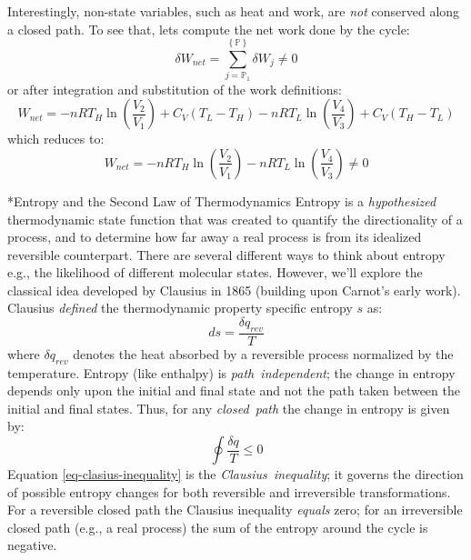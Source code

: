 \documentclass[11pt]{article}
\makeatletter
\theoremstyle{definition}
\renewcommand\subsection{\@startsection
	{subsection}{2}{0mm}
	{-0.05in}
	{0.5\baselineskip}
	{\normalfont\normalsize\bfseries}}
\makeatother
\begin{document}
Interestingly, non-state variables, such as heat and work, are \textit{not} conserved along a closed path. To see that, lets compute the
net work done by the cycle:
\begin{equation}
\delta{W}_{net} = \sum_{j=\mathbb{P}_{1}}^{\left\{\mathbb{P}\right\}}\delta{W}_j\neq 0
\end{equation}or after integration and substitution of the work definitions:
\begin{equation}
W_{net} = - nRT_{H}\ln\left(\frac{V_{2}}{V_{1}}\right) + C_{V}\left(T_{L} - T_{H}\right) - nRT_{L}\ln\left(\frac{V_{4}}{V_{3}}\right) + C_{V}\left(T_{H} - T_{L}\right)
\end{equation}which reduces to:
\begin{equation}
W_{net} = - nRT_{H}\ln\left(\frac{V_{2}}{V_{1}}\right) - nRT_{L}\ln\left(\frac{V_{4}}{V_{3}}\right) \neq{0}
\end{equation}

\clearpage

\subsection*{Entropy and the Second Law of Thermodynamics}
Entropy is a \textit{hypothesized} thermodynamic state function that was created to quantify the directionality of a process, and to determine how far away a
real process is from its idealized reversible counterpart. There are several different ways to think about entropy e.g., the likelihood of different molecular states.
However, we'll explore the classical idea developed by Clausius in 1865 (building upon Carnot's early work).
Clausius \textit{defined} the thermodynamic property specific entropy $s$ as:
\begin{equation}
ds = \frac{\delta{q}_{rev}}{T}
\end{equation}where $\delta{q}_{rev}$ denotes the heat absorbed by a reversible process normalized by the temperature.
Entropy (like enthalpy) is \textit{path~independent}; the change in entropy depends only upon the initial and final state and not the path taken between
the initial and final states. Thus, for any \textit{closed~path} the change in entropy is given by:
\begin{equation}\label{eq-clasius-inequality}
	\oint\frac{\delta{q}}{T}\leq{0}
\end{equation}
Equation \eqref{eq-clasius-inequality} is the \textit{Clausius~inequality};
it governs the direction of possible entropy changes for both reversible and irreversible transformations.
For a reversible closed path the Clausius inequality \textit{equals} zero;
for an irreversible closed path (e.g., a real process) the sum of the entropy around the cycle is negative.
\end{document}

